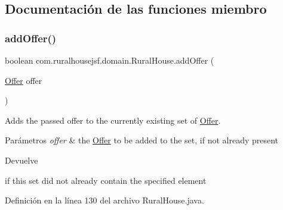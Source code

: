 \subsection{Documentación de las funciones miembro}
\mbox{\label{classcom_1_1ruralhousejsf_1_1domain_1_1_rural_house_a42b59123f7f6ac871f5510bb19a98884}} 
\subsubsection{\texorpdfstring{addOffer()}{addOffer()}}
{\footnotesize\ttfamily boolean com.\+ruralhousejsf.\+domain.\+Rural\+House.\+add\+Offer (\begin{DoxyParamCaption}\item[{\mbox{\hyperlink{classcom_1_1ruralhousejsf_1_1domain_1_1_offer}{Offer}}}]{offer }\end{DoxyParamCaption})}

Adds the passed offer to the currently existing set of \mbox{\hyperlink{classcom_1_1ruralhousejsf_1_1domain_1_1_offer}{Offer}}.


\begin{DoxyParams}{Parámetros}
{\em offer} & the \mbox{\hyperlink{classcom_1_1ruralhousejsf_1_1domain_1_1_offer}{Offer}} to be added to the set, if not already present \\
\hline
\end{DoxyParams}
\begin{DoxyReturn}{Devuelve}

\begin{DoxyCode}{0}
\DoxyCodeLine{\textcolor{keyword}{true} }
\end{DoxyCode}
 if this set did not already contain the specified element 
\end{DoxyReturn}


Definición en la línea 130 del archivo Rural\+House.\+java.

\mbox{\label{classcom_1_1ruralhousejsf_1_1domain_1_1_rural_house_affbd64026d988c58be52b7f7e5ebfbe8}} 
